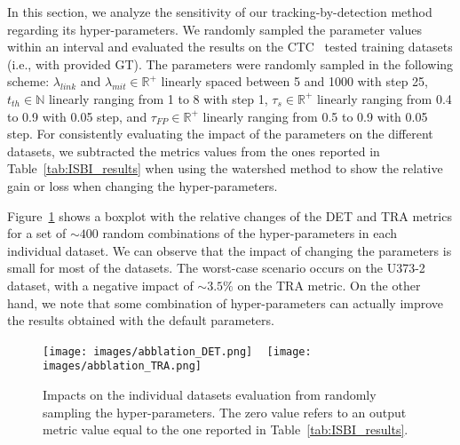\documentclass{article}
\begin{document}
In this section, we analyze the sensitivity of our tracking-by-detection method regarding its hyper-parameters. We randomly sampled the parameter values within an interval and evaluated the results on the CTC~\cite{isbi} tested training datasets (i.e., with provided GT). The parameters were randomly sampled in the following scheme: $\lambda_{link}$ and $\lambda_{mit} \in \mathbb{R^+}$ linearly spaced between 5 and 1000 with step 25, $t_{th} \in \mathbb{N}$ linearly ranging from 1 to 8 with step 1, $\tau_s \in \mathbb{R^+}$ linearly ranging from 0.4 to 0.9 with 0.05 step, and $\tau_{FP} \in \mathbb{R^+}$ linearly ranging from 0.5 to 0.9 with 0.05 step. For consistently evaluating the impact of the parameters on the different datasets, we subtracted the metrics values from the ones reported in Table~\ref{tab:ISBI_results} when using the watershed method to show the relative gain or loss when changing the hyper-parameters.

Figure~\ref{fig:abblation} shows a boxplot with the relative changes of the DET and TRA metrics for a set of $\sim\!400$ random combinations of the hyper-parameters in each individual dataset. We can observe that the impact of changing the parameters is small for most of the datasets. The worst-case scenario occurs on the U373-2 dataset, with a negative impact of $\sim\!3.5\%$ on the TRA metric. On the other hand, we note that some combination of hyper-parameters can actually improve the results obtained with the default parameters.

\begin{figure}[]
\centering
\texttt{[image: images/abblation\_DET.png]} ~
\texttt{[image: images/abblation\_TRA.png]}\\
\caption[Impacts on the individual datasets evaluation from randomly sampling the hyper-parameters.]{Impacts on the individual datasets evaluation from randomly sampling the hyper-parameters. The zero value refers to an output metric value equal to the one reported in Table~\ref{tab:ISBI_results}.}
\label{fig:abblation}
\end{figure}
\end{document}
